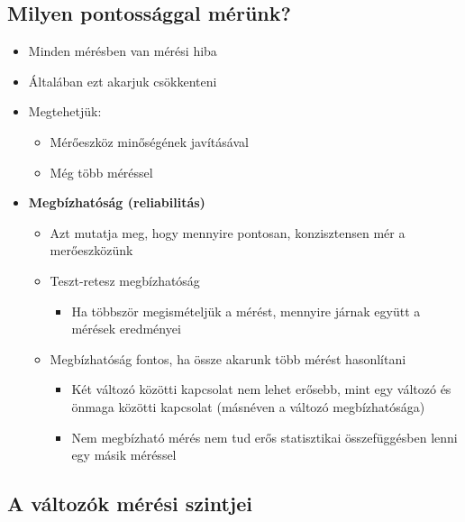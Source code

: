 \documentclass[
  letterpaper,
  DIV=11,
  numbers=noendperiod]{scrreprt}
\providecommand{\tightlist}{%
  \setlength{\itemsep}{0pt}\setlength{\parskip}{0pt}}\usepackage{longtable,booktabs,array}
\begin{document}
\hypertarget{milyen-pontossuxe1ggal-muxe9ruxfcnk}{%
\subsection{Milyen pontossággal
mérünk?}\label{milyen-pontossuxe1ggal-muxe9ruxfcnk}}

\begin{itemize}
\item
  Minden mérésben van mérési hiba
\item
  Általában ezt akarjuk csökkenteni
\item
  Megtehetjük:

  \begin{itemize}
  \item
    Mérőeszköz minőségének javításával
  \item
    Még több méréssel
  \end{itemize}
\item
  \textbf{Megbízhatóság (reliabilitás)}

  \begin{itemize}
  \item
    Azt mutatja meg, hogy mennyire pontosan, konzisztensen mér a
    merőeszközünk
  \item
    Teszt-retesz megbízhatóság

    \begin{itemize}
    \tightlist
    \item
      Ha többször megismételjük a mérést, mennyire járnak együtt a
      mérések eredményei
    \end{itemize}
  \item
    Megbízhatóság fontos, ha össze akarunk több mérést hasonlítani

    \begin{itemize}
    \item
      Két változó közötti kapcsolat nem lehet erősebb, mint egy változó
      és önmaga közötti kapcsolat (másnéven a változó megbízhatósága)
    \item
      Nem megbízható mérés nem tud erős statisztikai összefüggésben
      lenni egy másik méréssel
    \end{itemize}
  \end{itemize}
\end{itemize}

\hypertarget{a-vuxe1ltozuxf3k-muxe9ruxe9si-szintjei}{%
\subsection{A változók mérési
szintjei}\label{a-vuxe1ltozuxf3k-muxe9ruxe9si-szintjei}}
\end{document}
